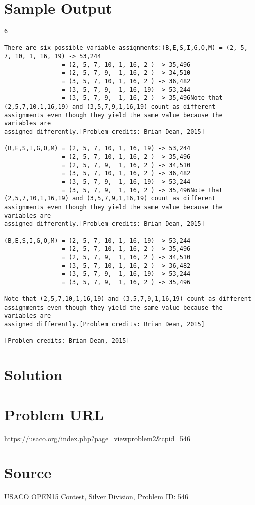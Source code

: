 \documentclass[12pt]{article}
\begin{document}
\section*{Sample Output}
\begin{verbatim}
6

There are six possible variable assignments:(B,E,S,I,G,O,M) = (2, 5, 7, 10, 1, 16, 19) -> 53,244
                = (2, 5, 7, 10, 1, 16, 2 ) -> 35,496
                = (2, 5, 7, 9,  1, 16, 2 ) -> 34,510
                = (3, 5, 7, 10, 1, 16, 2 ) -> 36,482
                = (3, 5, 7, 9,  1, 16, 19) -> 53,244
                = (3, 5, 7, 9,  1, 16, 2 ) -> 35,496Note that (2,5,7,10,1,16,19) and (3,5,7,9,1,16,19) count as different
assignments even though they yield the same value because the variables are
assigned differently.[Problem credits: Brian Dean, 2015]

(B,E,S,I,G,O,M) = (2, 5, 7, 10, 1, 16, 19) -> 53,244
                = (2, 5, 7, 10, 1, 16, 2 ) -> 35,496
                = (2, 5, 7, 9,  1, 16, 2 ) -> 34,510
                = (3, 5, 7, 10, 1, 16, 2 ) -> 36,482
                = (3, 5, 7, 9,  1, 16, 19) -> 53,244
                = (3, 5, 7, 9,  1, 16, 2 ) -> 35,496Note that (2,5,7,10,1,16,19) and (3,5,7,9,1,16,19) count as different
assignments even though they yield the same value because the variables are
assigned differently.[Problem credits: Brian Dean, 2015]

(B,E,S,I,G,O,M) = (2, 5, 7, 10, 1, 16, 19) -> 53,244
                = (2, 5, 7, 10, 1, 16, 2 ) -> 35,496
                = (2, 5, 7, 9,  1, 16, 2 ) -> 34,510
                = (3, 5, 7, 10, 1, 16, 2 ) -> 36,482
                = (3, 5, 7, 9,  1, 16, 19) -> 53,244
                = (3, 5, 7, 9,  1, 16, 2 ) -> 35,496

Note that (2,5,7,10,1,16,19) and (3,5,7,9,1,16,19) count as different
assignments even though they yield the same value because the variables are
assigned differently.[Problem credits: Brian Dean, 2015]

[Problem credits: Brian Dean, 2015]
\end{verbatim}

\section*{Solution}


\section*{Problem URL}
https://usaco.org/index.php?page=viewproblem2&cpid=546

\section*{Source}
USACO OPEN15 Contest, Silver Division, Problem ID: 546
\end{document}

